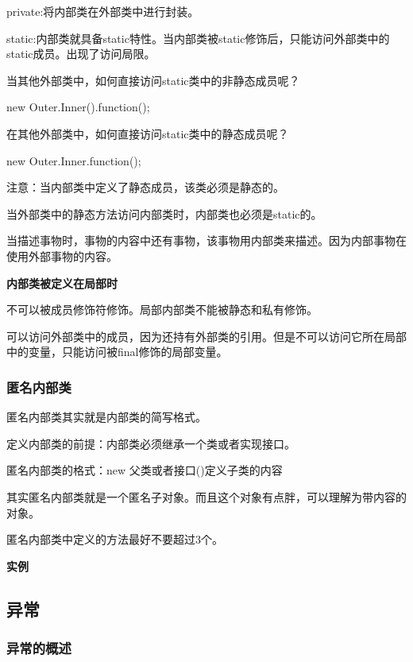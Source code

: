 \documentclass[UTF8]{ctexart}
\begin{document}
private:将内部类在外部类中进行封装。

static:内部类就具备static特性。当内部类被static修饰后，只能访问外部类中的static成员。出现了访问局限。

当其他外部类中，如何直接访问static类中的非静态成员呢？

new Outer.Inner().function();

在其他外部类中，如何直接访问static类中的静态成员呢？

new Outer.Inner.function();

注意：当内部类中定义了静态成员，该类必须是静态的。

	当外部类中的静态方法访问内部类时，内部类也必须是static的。

当描述事物时，事物的内容中还有事物，该事物用内部类来描述。因为内部事物在使用外部事物的内容。


\textbf{内部类被定义在局部时}

\textbullet 不可以被成员修饰符修饰。局部内部类不能被静态和私有修饰。

\textbullet 可以访问外部类中的成员，因为还持有外部类的引用。但是不可以访问它所在局部中的变量，只能访问被final修饰的局部变量。	

\subsubsection{匿名内部类}

\textbullet 匿名内部类其实就是内部类的简写格式。

\textbullet 定义内部类的前提：内部类必须继承一个类或者实现接口。

\textbullet 匿名内部类的格式：new 父类或者接口(){定义子类的内容}

\textbullet 其实匿名内部类就是一个匿名子对象。而且这个对象有点胖，可以理解为带内容的对象。

\textbullet 匿名内部类中定义的方法最好不要超过3个。



\textbf{实例}

\subsection{异常}
\subsubsection{异常的概述}
\end{document}
